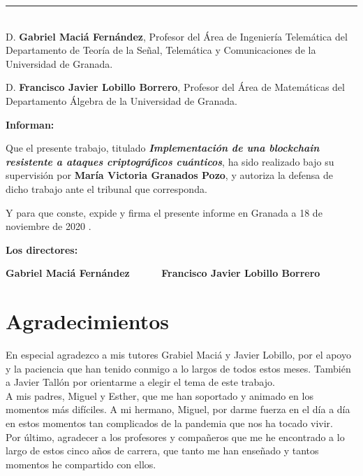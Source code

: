 \noindent\rule[-1ex]{\textwidth}{2pt}\\[4.5ex]

D. \textbf{Gabriel Maciá Fernández}, Profesor del Área de Ingeniería Telemática del Departamento de Teoría de la Señal, Telemática y Comunicaciones de la Universidad de Granada.

\vspace{0.5cm}

D. \textbf{Francisco Javier Lobillo Borrero}, Profesor del Área de Matemáticas del Departamento Álgebra de la Universidad de Granada.


\vspace{0.5cm}

\textbf{Informan:}

\vspace{0.5cm}

Que el presente trabajo, titulado \textit{\textbf{ Implementación de una blockchain resistente a ataques criptográficos cuánticos}},
ha sido realizado bajo su supervisión por \textbf{María Victoria Granados Pozo}, y autoriza la defensa de dicho trabajo ante el tribunal
que corresponda.

\vspace{0.5cm}

Y para que conste, expide y firma el presente informe en Granada a 18 de noviembre de 2020 .

\vspace{1cm}

\textbf{Los directores:}

\vspace{5cm}

\noindent \textbf{Gabriel Maciá Fernández \ \ \ \ \ Francisco Javier Lobillo Borrero}

\chapter*{Agradecimientos}
\thispagestyle{empty}

       \vspace{1cm}


En especial agradezco a mis tutores Grabiel Maciá y Javier Lobillo, por el apoyo y la paciencia que han tenido conmigo a lo largos de todos estos meses. También a Javier Tallón por orientarme a elegir el tema de este trabajo.\\

A mis padres, Miguel y Esther, que me han soportado y animado en los momentos más difíciles. A mi hermano, Miguel, por darme fuerza en el día a día en estos momentos tan complicados de la pandemia que nos ha tocado vivir.\\

Por último, agradecer a los profesores y compañeros que me he encontrado a lo largo de estos cinco años de carrera, que tanto me han enseñado y tantos momentos he compartido con ellos.\\
